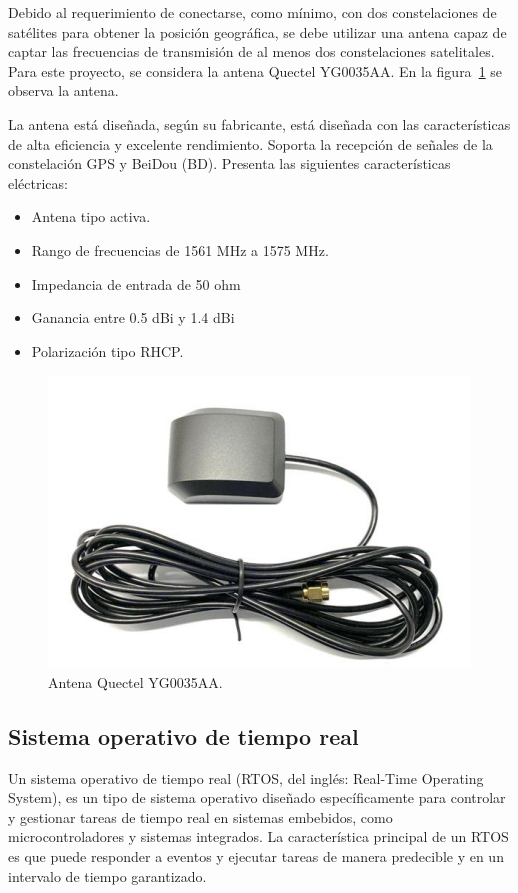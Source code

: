 Debido al requerimiento de conectarse, como mínimo, con dos constelaciones de satélites para obtener la posición geográfica, se debe utilizar una antena capaz de captar las frecuencias de transmisión de al menos dos constelaciones satelitales. Para este proyecto, se considera la antena Quectel YG0035AA. En la figura~\ref{fig:Antena} se observa la antena.

La antena está diseñada, según su fabricante, está diseñada con las características de alta eficiencia y excelente rendimiento. Soporta la recepción de señales de la constelación GPS y BeiDou (BD). Presenta las siguientes características eléctricas: 

\begin{itemize}
	\item Antena tipo activa.
	\item Rango de frecuencias de 1561 MHz a 1575 MHz.
	\item Impedancia de entrada de 50 ohm
	\item Ganancia entre 0.5 dBi y 1.4 dBi
	\item Polarización tipo RHCP. 
\end{itemize}

\begin{figure}[htbp]
	\centering
	\includegraphics[width=.5\textwidth]{./Figures/Antena_Quectel_YG0035AA.png}
	\caption{Antena Quectel YG0035AA\protect\footnotemark.}
	\label{fig:Antena}
\end{figure}



\subsection{Sistema operativo de tiempo real}
\label{sec:RTOS}

Un sistema operativo de tiempo real (RTOS, del inglés: Real-Time Operating System), es un tipo de sistema operativo diseñado específicamente para controlar y gestionar tareas de tiempo real en sistemas embebidos, como microcontroladores y sistemas integrados. La característica principal de un RTOS es que puede responder a eventos y ejecutar tareas de manera predecible y en un intervalo de tiempo garantizado.

